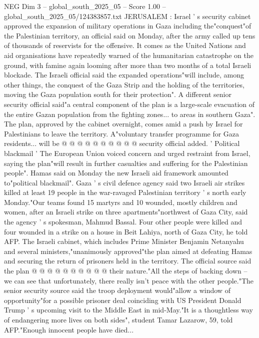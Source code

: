 \begin{textsample}{NEG Dim 3 – global\_south\_2025\_05 – Score 1.00 – global\_south\_2025\_05/124383857.txt}  \label{ex:f3_neg_228}
JERUSALEM : Israel ' s security cabinet approved the expansion of military operations in Gaza including the"conquest"of the Palestinian territory, an official said on Monday, after the army called up tens of thousands of reservists for the offensive.
It comes as the United Nations and aid organisations have repeatedly warned of the humanitarian catastrophe on the ground, with famine again looming after more than two months of a total Israeli blockade.
The Israeli official said the expanded operations"will include, among other things, the conquest of the Gaza Strip and the holding of the territories, moving the Gaza population south for their protection".
A different senior security official said"a central component of the plan is a large-scale evacuation of the entire Gazan population from the fighting zones... to areas in southern Gaza".
The plan, approved by the cabinet overnight, comes amid a push by Israel for Palestinians to leave the territory.
A"voluntary transfer programme for Gaza residents... will be @ @ @ @ @ @ @ @ @ @ security official added. ' Political blackmail ' The European Union voiced concern and urged restraint from Israel, saying the plan"will result in further casualties and suffering for the Palestinian people".
Hamas said on Monday the new Israeli aid framework amounted to"political blackmail".
Gaza ' s civil defence agency said two Israeli air strikes killed at least 19 people in the war-ravaged Palestinian territory ' s north early Monday."Our teams found 15 martyrs and 10 wounded, mostly children and women, after an Israeli strike on three apartments"northwest of Gaza City, said the agency ' s spokesman, Mahmud Bassal.
Four other people were killed and four wounded in a strike on a house in Beit Lahiya, north of Gaza City, he told AFP.
The Israeli cabinet, which includes Prime Minister Benjamin Netanyahu and several ministers,"unanimously approved"the plan aimed at defeating Hamas and securing the return of prisoners held in the territory.
The official source said the plan @ @ @ @ @ @ @ @ @ @ their nature."All the steps of backing down -- we can see that unfortunately, there really isn't peace with the other people."The senior security source said the troop deployment would"allow a window of opportunity"for a possible prisoner deal coinciding with US President Donald Trump ' s upcoming visit to the Middle East in mid-May."It is a thoughtless way of endangering more lives on both sides", student Tamar Lazarow, 59, told AFP."Enough innocent people have died...

\end{textsample}
